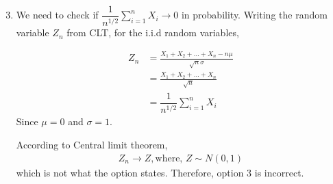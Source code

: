 \documentclass[journal,12pt,twocolumn]{IEEEtran}
\begin{document}
\begin{enumerate}
\setcounter{enumi}{2}
    
\item We need to check if $\dfrac{1}{n^{1/2}} \sum_{i=1}^n X_i \to 0$ in probability. Writing the random variable $Z_n$ from CLT, for the i.i.d random variables,

    \begin{align}
        Z_n &= \frac{X_1 + X_2 + \ldots + X_n - n\mu}{\sqrt{n}\sigma}\\
        &= \frac{X_1 + X_2 + \ldots + X_n}{\sqrt{n}}\\
        &= \dfrac{1}{n^{1/2}} \sum_{i=1}^n X_i
    \end{align}
Since $\mu = 0$ and $\sigma = 1$.

According to Central limit theorem, 
\begin{align}
    Z_n \to Z, \text{where, } Z \sim N(0,1)
\end{align}
which is not what the option states. Therefore, option 3 is incorrect.
\end{enumerate}
\end{document}
